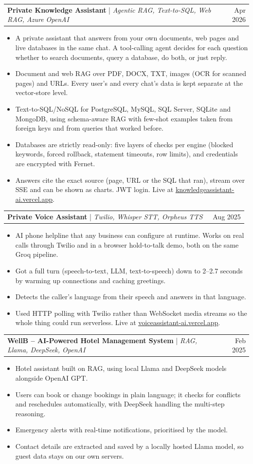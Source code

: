 \documentclass[letterpaper,11pt]{article}
\makeatletter
\newcommand{\resumeItem}[1]{
  \item\small{
    {#1 \vspace{-2pt}}
  }
}
\newcommand{\resumeProjectHeading}[2]{
    \item
    \begin{tabular*}{0.97\textwidth}{l@{\extracolsep{\fill}}r}
      \small#1~ & #2 \\
    \end{tabular*}\vspace{-7pt}
}
\newcommand{\resumeItemListStart}{\begin{itemize}}
\newcommand{\resumeItemListEnd}{\end{itemize}\vspace{-5pt}}
\makeatother
\begin{document}
      \resumeProjectHeading
          {\textbf{Private Knowledge Assistant} | \emph{Agentic RAG, Text-to-SQL, Web RAG, Azure OpenAI}}{Apr 2026}
          \resumeItemListStart
            \resumeItem{A private assistant that answers from your own documents, web pages and live databases in the same chat. A tool-calling agent decides for each question whether to search documents, query a database, do both, or just reply.}
            \resumeItem{Document and web RAG over PDF, DOCX, TXT, images (OCR for scanned pages) and URLs. Every user's and every chat's data is kept separate at the vector-store level.}
            \resumeItem{Text-to-SQL/NoSQL for PostgreSQL, MySQL, SQL Server, SQLite and MongoDB, using schema-aware RAG with few-shot examples taken from foreign keys and from queries that worked before.}
            \resumeItem{Databases are strictly read-only: five layers of checks per engine (blocked keywords, forced rollback, statement timeouts, row limits), and credentials are encrypted with Fernet.}
            \resumeItem{Answers cite the exact source (page, URL or the SQL that ran), stream over SSE and can be shown as charts. JWT login. Live at \href{https://knowledgeassistant-ai.vercel.app}{\underline{knowledgeassistant-ai.vercel.app}}.}
          \resumeItemListEnd

      \resumeProjectHeading
          {\textbf{Private Voice Assistant} | \emph{Twilio, Whisper STT, Orpheus TTS}}{Aug 2025}
          \resumeItemListStart
            \resumeItem{AI phone helpline that any business can configure at runtime. Works on real calls through Twilio and in a browser hold-to-talk demo, both on the same Groq pipeline.}
            \resumeItem{Got a full turn (speech-to-text, LLM, text-to-speech) down to 2--2.7 seconds by warming up connections and caching greetings.}
            \resumeItem{Detects the caller's language from their speech and answers in that language.}
            \resumeItem{Used HTTP polling with Twilio rather than WebSocket media streams so the whole thing could run serverless. Live at \href{https://voiceassistant-ai.vercel.app}{\underline{voiceassistant-ai.vercel.app}}.}
          \resumeItemListEnd

      \resumeProjectHeading
          {\textbf{WellB -- AI-Powered Hotel Management System} | \emph{RAG, Llama, DeepSeek, OpenAI}}{Feb 2025}
          \resumeItemListStart
            \resumeItem{Hotel assistant built on RAG, using local Llama and DeepSeek models alongside OpenAI GPT.}
            \resumeItem{Users can book or change bookings in plain language; it checks for conflicts and reschedules automatically, with DeepSeek handling the multi-step reasoning.}
            \resumeItem{Emergency alerts with real-time notifications, prioritised by the model.}
            \resumeItem{Contact details are extracted and saved by a locally hosted Llama model, so guest data stays on our own servers.}
          \resumeItemListEnd
\end{document}
